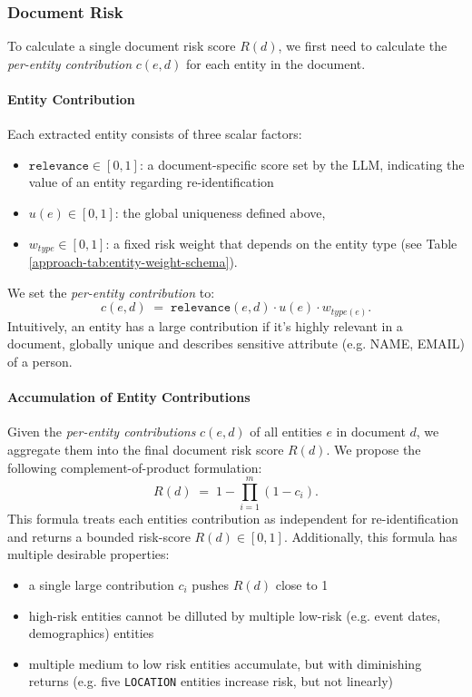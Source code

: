 \subsubsection{Document Risk}\label{approach-subsubsec:document_risk}
To calculate a single document risk score $R(d)$, we first need to calculate the \textit{per-entity contribution} $c(e,d)$ for each entity in the document. 
\paragraph{Entity Contribution}
Each extracted entity consists of three scalar factors:
\begin{itemize}
\item $\texttt{relevance}\in[0,1]$: a document-specific score set by the LLM, indicating the value of an entity regarding re-identification
\item $u(e)\in[0,1]$: the global uniqueness defined above,
\item $w_{type}\in[0,1]$: a fixed risk weight that depends on the entity type (see Table \ref{approach-tab:entity-weight-schema}).
\end{itemize}
We set the \textit{per-entity contribution} to:
\[
c(e,d) \;=\; \texttt{relevance}(e,d) \cdot u(e) \cdot w_{type(e)}.
\]
Intuitively, an entity has a large contribution if it's highly relevant in a document, globally unique and describes sensitive attribute (e.g. NAME, EMAIL) of a person.
\paragraph{Accumulation of Entity Contributions}
Given the \textit{per-entity contributions} $c(e,d)$ of all entities $e$ in document $d$, we aggregate them into the final document risk score $R(d)$. We propose the following complement-of-product formulation:
\[
R(d) \;=\; 1 - \prod_{i=1}^m (1 - c_i).
\]
This formula treats each entities contribution as independent for re-identification and returns a bounded risk-score $R(d)\in[0,1]$. Additionally, this formula has multiple desirable properties:
\begin{itemize}
    \item a single large contribution $c_i$ pushes $R(d)$ close to 1
    \item high-risk entities cannot be dilluted by multiple low-risk (e.g. event dates, demographics) entities 
    \item multiple medium to low risk entities accumulate, but with diminishing returns (e.g. five \texttt{LOCATION} entities increase risk, but not linearly)
\end{itemize}

